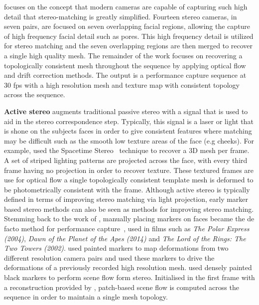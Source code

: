 focuses on the concept that modern cameras are capable of capturing such high
detail that stereo-matching is greatly simplified. Fourteen stereo cameras, in
seven pairs, are focused on seven overlapping facial regions, allowing the
capture of high frequency facial detail such as pores. This high frequency
detail is utilized for stereo matching and the seven overlapping regions are
then merged to recover a single high quality mesh. The remainder of the work
focuses on recovering a topologically consistent mesh throughout the sequence by
applying optical flow and drift correction methods. The output is a performance
capture sequence at 30 fps with a high resolution mesh and texture map 
with consistent topology across the sequence.

\textbf{Active stereo} augments traditional passive stereo with a signal that is
used to aid in the stereo correspondence step. Typically, this signal is a laser
or light that is shone on the subjects faces in order to give consistent
features where matching may be difficult such as the smooth low texture areas of
the face (e.g cheeks). For example, \citet{zhang2004spacetime} used the
Spacetime Stereo~\cite{zhang2003spacetime,davis2005spacetime} technique to
recover a 3D mesh per frame. A set of striped lighting patterns are projected
across the face, with every third frame having no projection in order to recover
texture. These textured frames are use for optical flow a single topologically
consistent template mesh is deformed to be photometrically consistent with the
frame.
Although active stereo is typically defined in terms of improving stereo
matching via light projection, early marker based stereo methods can also be
seen as methods for improving stereo matching.
Stemming back to the work of \citet{williams1990performance}, manually placing
markers on faces became the de facto method for performance 
capture~\cite{bickel2007multi,furukawa2009dense,bredow2005mocap}, 
used in films such as \textit{The Polar Express (2004)}, 
\textit{Dawn of the Planet of the Apes (2014)} and 
\textit{The Lord of the Rings: The Two Towers (2002)}. 
\citet{bickel2007multi} used painted markers to map deformations from two 
different resolution camera pairs and used these markers to drive the
deformations of a previously recorded high resolution mesh. 
\citet{furukawa2009dense} used densely painted black markers to perform
scene flow form stereo. Initialised in the first frame with a reconstruction
provided by \citet{Furu:2010:PMVS}, patch-based scene flow is computed across 
the sequence in order to maintain a single mesh topology. 

